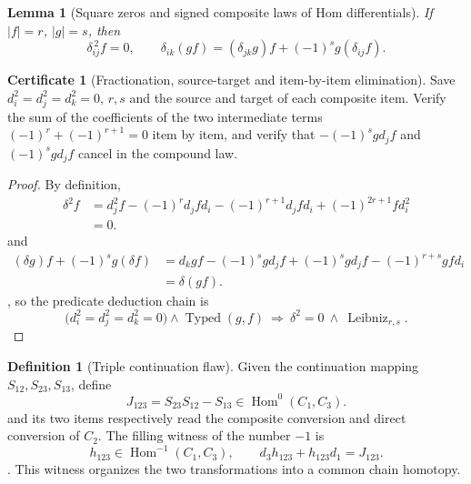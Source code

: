 \documentclass[12pt,a4paper,openany,notitlepage]{report}
\theoremstyle{plain}
\newtheorem{lemma}[theorem]{Lemma}
\theoremstyle{definition}
\newtheorem{definition}[theorem]{Definition}
\newtheorem*{certificate}{Certificate}
\theoremstyle{remark}
\begin{document}
\begin{CJK*}
\begin{lemma}
[Square zeros and signed composite laws of Hom differentials]\label{hgov:lem-hom}
If $|f|=r$, $|g|=s$, then \[
 \delta_{ij}^{\,2}f=0,\qquad
 \delta_{ik}(gf)=(\delta_{jk}g)f+(-1)^s g(\delta_{ij}f).
\]\end{lemma}
\begin{certificate}
[Fractionation, source-target and item-by-item elimination]Save $d_i^2=d_j^2=d_k^2=0$, $r,s$ and the source and target of each composite item. Verify the sum of the coefficients of the two intermediate terms $(-1)^r+(-1)^{r+1}=0$ item by item, and verify that $-(-1)^s gd_jf$ and $(-1)^s gd_jf$ cancel in the compound law.\end{certificate}
\begin{proof}
By definition, \[
 \begin{aligned}
 \delta^2f
 &=d_j^2f-(-1)^rd_jfd_i
   -(-1)^{r+1}d_jfd_i+(-1)^{2r+1}fd_i^2\\
 &=0.
 \end{aligned}
\] and \[
 \begin{aligned}
 (\delta g)f+(-1)^sg(\delta f)
 &=d_kgf-(-1)^sgd_jf
   +(-1)^sgd_jf-(-1)^{r+s}gfd_i\\
 &=\delta(gf).
 \end{aligned}
\], so the predicate deduction chain is \[
 \bigl(d_i^2=d_j^2=d_k^2=0\bigr)\wedge
 \operatorname{Typed}(g,f)
 \ \Longrightarrow\
 \delta^2=0\ \wedge\ \operatorname{Leibniz}_{r,s}.
\]\end{proof}


\begin{definition}
[Triple continuation flaw]\label{hgov:def-defect}
Given the continuation mapping $S_{12},S_{23},S_{13}$, define \[
 J_{123}=S_{23}S_{12}-S_{13}
 \in\operatorname{Hom}^0(C_1,C_3).
\] and its two items respectively read the composite conversion and direct conversion of $C_2$. The filling witness of the number $-1$ is \[
 h_{123}\in\operatorname{Hom}^{-1}(C_1,C_3),\qquad
 d_3h_{123}+h_{123}d_1=J_{123}.
\]. This witness organizes the two transformations into a common chain homotopy.\end{definition}



\end{CJK*}
\end{document}
